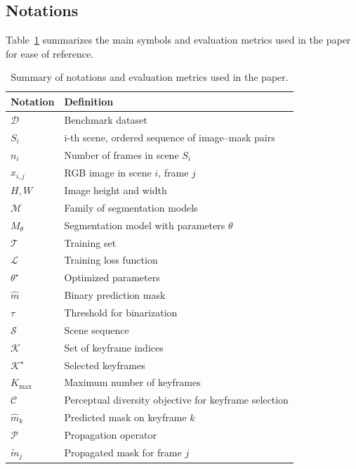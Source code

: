 \documentclass[preprint,12pt]{elsarticle}
\begin{document}
\subsection{Notations}
\label{sec:notations}
Table~\ref{tab:symbols_metrics} summarizes the main symbols and evaluation metrics used in the paper for ease of reference.

\begin{table}[!htbp]
\centering
\small
\setlength{\tabcolsep}{6pt}
\caption{Summary of notations and evaluation metrics used in the paper.}
\label{tab:symbols_metrics}
\begin{tabular}{l p{8cm}}
\toprule
\textbf{Notation} & \textbf{Definition} \\
\midrule
\rowcolor{gray!12}$\mathcal{D}$ & Benchmark dataset \\
$S_i$ & i-th scene, ordered sequence of image–mask pairs \\
\rowcolor{gray!12}$n_i$ & Number of frames in scene $S_i$ \\
$x_{i,j}$ & RGB image in scene $i$, frame $j$ \\
\rowcolor{gray!12}$H, W$ & Image height and width \\
$\mathcal{M}$ & Family of segmentation models \\
\rowcolor{gray!12}$M_\theta$ & Segmentation model with parameters $\theta$ \\
$\mathcal{T}$ & Training set \\
\rowcolor{gray!12}$\mathcal{L}$ & Training loss function \\
$\theta^\star$ & Optimized parameters \\
\rowcolor{gray!12}$\hat m$ & Binary prediction mask \\
$\tau$ & Threshold for binarization \\
\rowcolor{gray!12}$\mathcal{S}$ & Scene sequence \\
$\mathcal{K}$ & Set of keyframe indices \\
\rowcolor{gray!12}$\mathcal{K}^\star$ & Selected keyframes \\
$K_{\max}$ & Maximum number of keyframes \\
\rowcolor{gray!12}$\mathcal{C}$ & Perceptual diversity objective for keyframe selection \\
$\hat m_k$ & Predicted mask on keyframe $k$ \\
\rowcolor{gray!12}$\mathcal{P}$ & Propagation operator \\
$\tilde m_j$ & Propagated mask for frame $j$ \\

\end{tabular}
\end{table}
\end{document}
